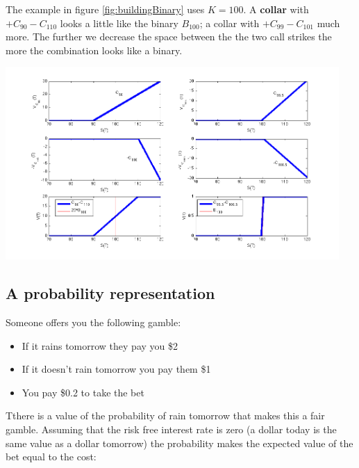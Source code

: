 The example in figure \ref{fig:buildingBinary} uses $K=100$. A \textbf{collar} with $+C_{90}-C_{110}$ looks a little like the binary $B_{100}$; a collar with  $+C_{99}-C_{101}$ much more. The further we decrease the space between the the two call strikes the more the combination looks like a binary. 

  \begin{center}
\includegraphics[width=5in]{pics/buildingBinary}%
\label{fig:buildingBinary}%
\end{center}


\subsection{A probability representation}

Someone offers you the following gamble:

\begin{itemize}
\item If it rains tomorrow they pay you \$2
\item If it doesn't rain tomorrow you pay them \$1
\item You pay \$0.2 to take the bet
\end{itemize}

Tthere is a value of the probability of rain tomorrow that makes this a fair gamble. Assuming that the risk free interest rate is zero (a dollar today is the same value as a dollar tomorrow) the probability makes the expected value of the bet equal to the cost:

